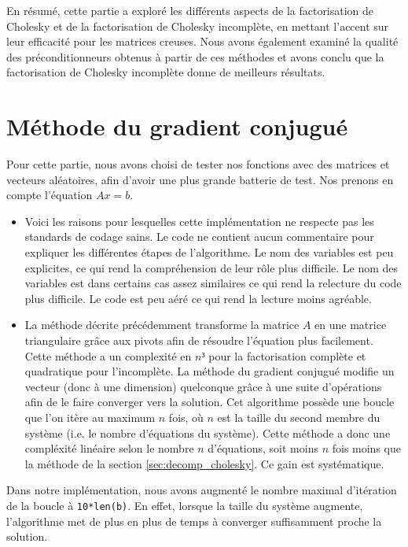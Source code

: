 \documentclass{article}
\begin{document}
En résumé, cette partie a exploré les différents aspects de la factorisation de Cholesky et de la factorisation de Cholesky incomplète, en mettant l'accent sur leur efficacité pour les matrices creuses. 
Nous avons également examiné la qualité des préconditionneurs obtenus à partir de ces méthodes et avons conclu que la factorisation de Cholesky incomplète donne de meilleurs résultats.
\section{Méthode du gradient conjugué}
\label{sec:meth_grad_conj}

Pour cette partie, nous avons choisi de tester nos fonctions avec des matrices et vecteurs aléatoires, afin d'avoir une plus grande batterie de test. Nos prenons en compte l'équation $Ax = b$.

\begin{itemize}
  \item Voici les raisons pour lesquelles cette implémentation ne respecte pas les standards de codage sains. Le code ne contient aucun commentaire pour expliquer les différentes étapes de l'algorithme. Le nom des variables est peu explicites, ce qui rend la compréhension de leur rôle plus difficile. Le nom des variables est dans certains cas assez similaires ce qui rend la relecture du code plus difficile. Le code est peu aéré ce qui rend la lecture moins agréable.
  \item La méthode décrite précédemment transforme la matrice $A$ en une matrice triangulaire grâce aux pivots afin de résoudre l'équation plus facilement. Cette méthode a un complexité en $n³$ pour la factorisation complète et quadratique pour l'incomplète. La méthode du gradient conjugué modifie un vecteur (donc à une dimension) quelconque grâce à une suite d'opérations afin de le faire converger vers la solution. Cet algorithme possède une boucle que l'on itère au maximum $n$ fois, où $n$ est la taille du second membre du système (i.e. le nombre d'équations du système). Cette méthode a donc une compléxité linéaire selon le nombre $n$ d'équations, soit moins $n$ fois moins que la méthode de la section \ref{sec:decomp_cholesky}. Ce gain est systématique.
\end{itemize}

\vspace{3mm}
Dans notre implémentation, nous avons augmenté le nombre maximal d'itération de la boucle à \verb|10*len(b)|. En effet, lorsque la taille du système augmente, l'algorithme met de plus en plus de temps à converger suffisamment proche la solution.
\end{document}
